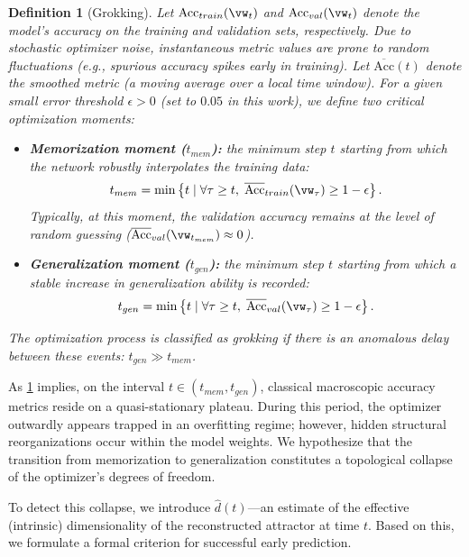 \documentclass{article}
\newtheorem{definition}{Definition}
\begin{document}
\begin{definition}[Grokking]\label{def:grokking}
Let $\text{Acc}_{train}(\vw_t)$ and $\text{Acc}_{val}(\vw_t)$ denote the model's accuracy on the training and validation sets, respectively. Due to stochastic optimizer noise, instantaneous metric values are prone to random fluctuations (e.g., spurious accuracy spikes early in training). Let $\overline{\text{Acc}}(t)$ denote the smoothed metric (a moving average over a local time window). For a given small error threshold $\epsilon > 0$ (set to $0.05$ in this work), we define two critical optimization moments:
\begin{itemize}
    \item \textbf{Memorization moment ($t_{mem}$):} the minimum step $t$ starting from which the network robustly interpolates the training data:
    $$t_{mem} = \min \left\{ t \mid \forall \tau \ge t, \; \overline{\text{Acc}}_{train}(\vw_\tau) \ge 1 - \epsilon \right\}.$$
    Typically, at this moment, the validation accuracy remains at the level of random guessing ($\overline{\text{Acc}}_{val}(\vw_{t_{mem}}) \approx 0$).
    
    \item \textbf{Generalization moment ($t_{gen}$):} the minimum step $t$ starting from which a stable increase in generalization ability is recorded:
    $$t_{gen} = \min \left\{ t \mid \forall \tau \ge t, \; \overline{\text{Acc}}_{val}(\vw_\tau) \ge 1 - \epsilon \right\}.$$
\end{itemize}
The optimization process is classified as grokking if there is an anomalous delay between these events: $t_{gen} \gg t_{mem}$.
\end{definition}

As \cref{def:grokking} implies, on the interval $t \in (t_{mem}, t_{gen})$, classical macroscopic accuracy metrics reside on a quasi-stationary plateau. During this period, the optimizer outwardly appears trapped in an overfitting regime; however, hidden structural reorganizations occur within the model weights. We hypothesize that the transition from memorization to generalization constitutes a topological collapse of the optimizer's degrees of freedom.

To detect this collapse, we introduce $\hat{d}(t)$—an estimate of the effective (intrinsic) dimensionality of the reconstructed attractor at time $t$. Based on this, we formulate a formal criterion for successful early prediction.
\end{document}
